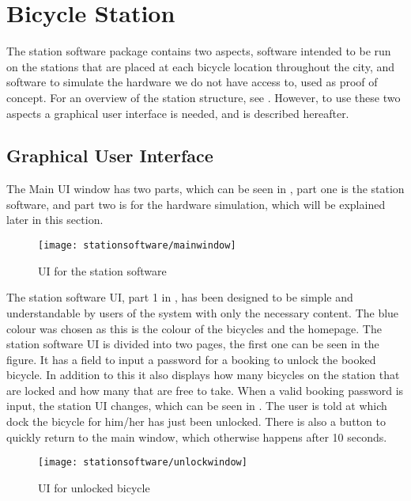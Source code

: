 \section{Bicycle Station}
The station software package contains two aspects, software intended to be run on the stations that are placed at each bicycle location throughout the city, and software to simulate the hardware we do not have access to, used as proof of concept.
For an overview of the station structure, see . 
However, to use these two aspects a graphical user interface is needed, and is described hereafter.

\subsection{Graphical User Interface}
The Main UI window has two parts, which can be seen in , part one is the station software, and part two is for the hardware simulation, which will be explained later in this section.

\begin{figure}[h]
	\centering
	\texttt{[image: stationsoftware/mainwindow]}
	\caption{UI for the station software}\label{fig:stationMain}
\end{figure}

The station software UI, part 1 in , has been designed to be simple and understandable by users of the system with only the necessary content.
The blue colour was chosen as this is the colour of the bicycles and the \bycykel homepage.
The station software UI is divided into two pages, the first one can be seen in the figure.
It has a field to input a password for a booking to unlock the booked bicycle.
In addition to this it also displays how many bicycles on the station that are locked and how many that are free to take.
When a valid booking password is input, the station UI changes, which can be seen in .
The user is told at which dock the bicycle for him/her has just been unlocked.
There is also a button to quickly return to the main window, which otherwise happens after 10 seconds.

\begin{figure}[h]
	\centering
	\texttt{[image: stationsoftware/unlockwindow]}
	\caption{UI for unlocked bicycle}\label{fig:bicycleUnlock}
\end{figure}

